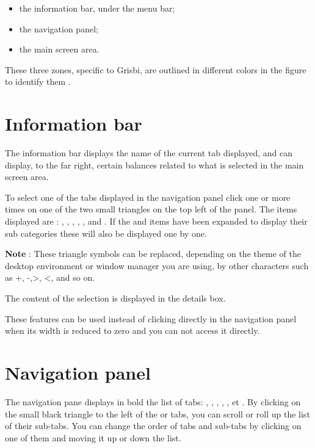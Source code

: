 \begin{itemize}
	 \item the information bar, under the menu bar;
	 \item the navigation panel;
	 \item the main screen area.
\end{itemize}

\ifIllustration 
These three zones, specific to Grisbi, are outlined in different colors in the figure to identify them .
\else
\fi

\section{Information bar\label{home-synthesis}}

The information bar displays the name of the current tab displayed, and can display, to the far right, certain balances related to what is selected in the main screen area.


To select one of the tabs displayed in the navigation panel click one or more times on one of the two small triangles on the top left of the panel.  The items displayed are : , , , , ,  and .  If the  and  items have been expanded to display their sub categories these will also be displayed one by one.

\textbf{Note} : These triangle symbols can be replaced, depending on the theme of the desktop environment or window manager you are using, by other characters such as +, -,>, <, and so on.

The content of the selection is displayed in the details box.

These features can be used instead of clicking directly in the navigation panel when its width is reduced to zero and you can not access it directly.


\section{Navigation panel\label{home-accounting}}

The navigation pane displays in bold the list of tabs:  , , , , ,  et . By clicking on the small black triangle to the left of the   or  tabs,  you can scroll or roll up the list of their sub-tabs. You can change the order of tabs and sub-tabs by clicking on one of them and moving it up or down the list.

